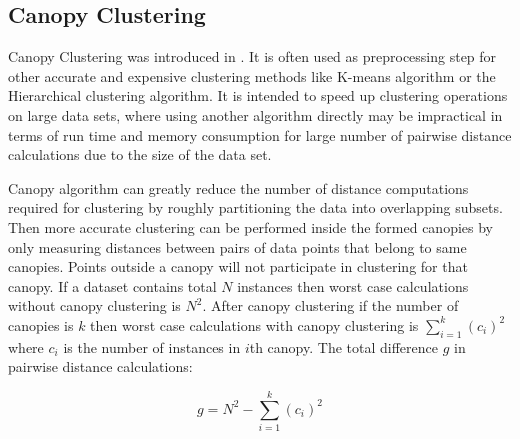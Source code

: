 \documentclass[10pt, conference, compsocconf]{IEEEtran}
\begin{document}
\subsection{Canopy Clustering}

Canopy Clustering was introduced in \cite{MARCanopy}. It is often used as preprocessing step for other accurate and expensive clustering methods like K-means algorithm or the Hierarchical clustering algorithm. It is intended to speed up clustering operations on large data sets, where using another algorithm directly may be impractical in terms of run time and memory consumption for large number of pairwise distance calculations due to the size of the data set.

Canopy algorithm can greatly reduce the number of distance computations required for clustering by roughly partitioning the data into overlapping subsets. Then more accurate clustering can be performed inside the formed canopies by only measuring distances between pairs of data points that belong to same canopies. Points outside a canopy will not participate in clustering for that canopy. If a dataset contains total $N$ instances then worst case calculations without canopy clustering is $N^2$. After canopy clustering if the number of canopies is $k$ then worst case calculations with canopy clustering is $\sum_{i=1}^{k}(c_i)^2$ where $c_i$ is the number of instances in $i$th canopy. The total difference $g$ in pairwise distance calculations:

\begin{equation}
g=N^2-\sum_{i=1}^{k}(c_i)^2
\end{equation} 
\end{document}
